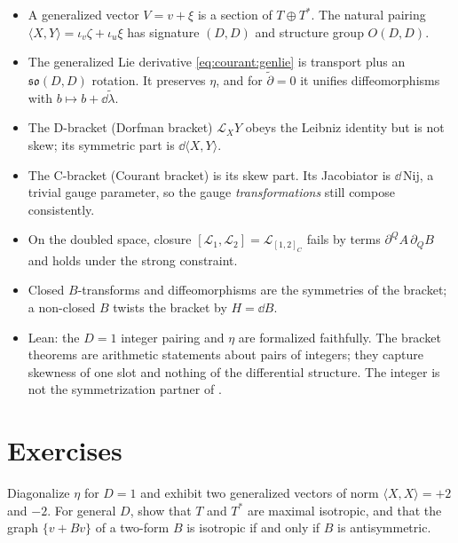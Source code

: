 \begin{summarybox}
\begin{itemize}[nosep,leftmargin=*]
\item A generalized vector $V=v+\xi$ is a section of $T\oplus T^*$. The natural pairing
$\langle X,Y\rangle=\iota_v\zeta+\iota_u\xi$ has signature $(D,D)$ and structure group $O(D,D)$.
\item The generalized Lie derivative \eqref{eq:courant:genlie} is transport plus an
$\mathfrak{so}(D,D)$ rotation. It preserves $\eta$, and for $\tilde\partial=0$ it unifies
diffeomorphisms with $b\mapsto b+\dd\tilde\lambda$.
\item The D-bracket (Dorfman bracket) $\mathcal L_XY$ obeys the Leibniz identity but is not skew;
its symmetric part is $\dd\langle X,Y\rangle$.
\item The C-bracket (Courant bracket) is its skew part. Its Jacobiator is
$\dd\,\mathrm{Nij}$, a trivial gauge parameter, so the gauge \emph{transformations} still compose
consistently.
\item On the doubled space, closure $[\mathcal L_1,\mathcal L_2]=\mathcal L_{[1,2]_C}$ fails by
terms $\partial^QA\,\partial_QB$ and holds under the strong constraint.
\item Closed $B$-transforms and diffeomorphisms are the symmetries of the bracket; a non-closed $B$
twists the bracket by $H=\dd B$.
\item Lean: the $D=1$ integer pairing and $\eta$ are formalized faithfully. The bracket theorems
are arithmetic statements about pairs of integers; they capture skewness of one slot and nothing
of the differential structure. The integer  is not the symmetrization
partner of .
\end{itemize}
\end{summarybox}

\section*{Exercises}

\begin{exercise}[$\star$]\label{exr:courant:sig}
Diagonalize $\eta$ for $D=1$ and exhibit two generalized vectors of norm $\langle X,X\rangle=+2$
and $-2$. For general $D$, show that $T$ and $T^*$ are maximal isotropic, and that the graph
$\{v+Bv\}$ of a two-form $B$ is isotropic if and only if $B$ is antisymmetric.
\end{exercise}

